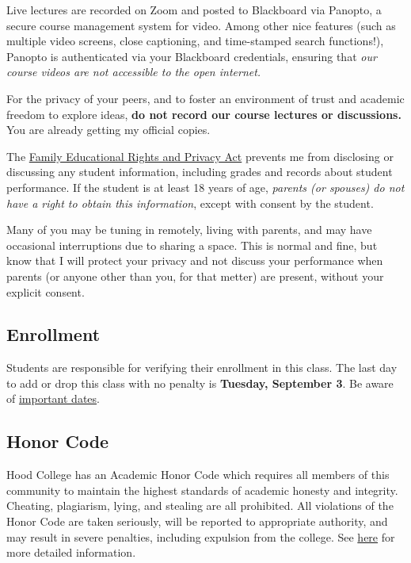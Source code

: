 \documentclass{article}
\begin{document}
Live lectures are recorded on Zoom and posted to Blackboard via Panopto,
a secure course management system for video. Among other nice features
(such as multiple video screens, close captioning, and time-stamped
search functions!), Panopto is authenticated via your Blackboard
credentials, ensuring that \emph{our course videos are not accessible to
the open internet.}

For the privacy of your peers, and to foster an environment of trust and
academic freedom to explore ideas, \textbf{do not record our course
lectures or discussions.} You are already getting my official copies.

The
\href{https://www2.ed.gov/policy/gen/guid/fpco/ferpa/index.html}{Family
Educational Rights and Privacy Act} prevents me from disclosing or
discussing any student information, including grades and records about
student performance. If the student is at least 18 years of age,
\emph{parents (or spouses) do not have a right to obtain this
information}, except with consent by the student.

Many of you may be tuning in remotely, living with parents, and may have
occasional interruptions due to sharing a space. This is normal and
fine, but know that I will protect your privacy and not discuss your
performance when parents (or anyone other than you, for that metter) are
present, without your explicit consent.

\hypertarget{enrollment}{%
\subsection*{Enrollment}\label{enrollment}}

Students are responsible for verifying their enrollment in this class.
The last day to add or drop this class with no penalty is
\textbf{Tuesday, September 3}. Be aware of
\href{https://www.hood.edu/offices-services/registrars-office/academic-calendar}{important
dates}.

\hypertarget{honor-code}{%
\subsection*{Honor Code}\label{honor-code}}

Hood College has an Academic Honor Code which requires all members of
this community to maintain the highest standards of academic honesty and
integrity. Cheating, plagiarism, lying, and stealing are all prohibited.
All violations of the Honor Code are taken seriously, will be reported
to appropriate authority, and may result in severe penalties, including
expulsion from the college. See
\href{http://hood.smartcatalogiq.com/en/2016-2017/Catalog/The-Spirit-of-Hood/The-Academic-Honor-Code-and-Code-of-Conduct}{here}
for more detailed information.
\end{document}
